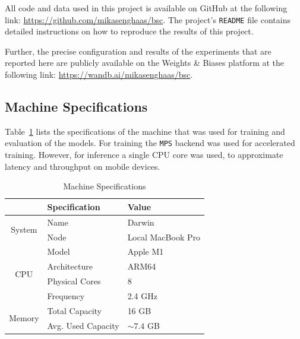 \documentclass[a4paper]{article}
\begin{document}
  All code and data used in this project is available on GitHub at the
  following link: \url{https://github.com/mikasenghaas/bsc}. The project's 
  \texttt{README} file contains detailed instructions on how to reproduce the
  results of this project.

  Further, the precise configuration and results of the experiments that are
  reported here are publicly available on the Weights \& Biases platform at the
  following link: \url{https://wandb.ai/mikasenghaas/bsc}.


  \subsection{Machine Specifications} %
  \label{sub:machine-specs}

  Table~\ref{tab:machine-specs} lists the specifications of the machine that was
  used for training and evaluation of the models. For training the \texttt{MPS}
  backend was used for accelerated training. However, for inference a single CPU
  core was used, to approximate latency and throughput on mobile devices.

  \begin{table}[ht]
    \centering
    \begin{tabular}{cll}
     \toprule
     & Specification & Value \\
     \midrule

     \multirow{2}{*}{System} & Name & Darwin \\
     \vspace{0.1cm}
     & Node & Local MacBook Pro \\

     \multirow{4}{*}{CPU} & Model & Apple M1 \\
     & Architecture & ARM64 \\
     & Physical Cores & 8 \\
     \vspace{0.1cm}
     & Frequency & 2.4 GHz \\

     \multirow{2}{*}{Memory} & Total Capacity & 16 GB \\
     & Avg. Used Capacity & $\sim 7.4$ GB \\

     \bottomrule
    \end{tabular}
    \caption{Machine Specifications}
    \label{tab:machine-specs}
  \end{table}
  


  \newpage
  
  
\end{document}
